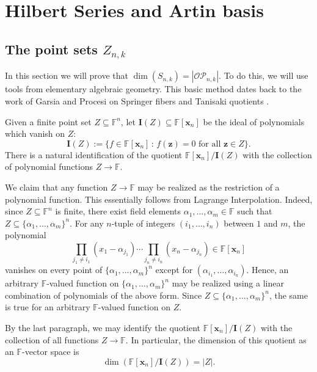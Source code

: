 \documentclass[ALCO,ThmDefs,published]{cedram}
\newcommand{\xx}{{\mathbf {x}}}
\newcommand{\FF}{{\mathbb{F}}}
\theoremstyle{plain}
\newcommand{\OP}{{\mathcal{OP}}}
\newcommand{\FF}{{\mathbb{F}}}
\newcommand{\zz}{{\mathbf {z}}}
\newcommand{\xx}{{\mathbf {x}}}
\newcommand{\II}{{\mathbf {I}}}
\begin{document}
\section{Hilbert Series and Artin basis}
\label{Hilbert}


\subsection{The point sets $Z_{n,k}$}
In this section we will prove that $\dim(S_{n,k}) = |\OP_{n,k}|$.
To do this, we will use tools from elementary algebraic geometry.
This basic method dates back to the work of Garsia and Procesi on Springer
fibers and Tanisaki quotients \cite{GP}.

Given a finite point set $Z \subseteq \FF^n$, let $\II(Z) \subseteq \FF[\xx_n]$ be the ideal of 
polynomials which vanish on $Z$:
\begin{equation}
\II(Z) := \{ f \in \FF[\xx_n] \,:\, f(\zz) = 0 \text{ for all $\zz \in Z$} \}.
\end{equation} 
There is a natural identification of the quotient ${\FF[\xx_n]} / {\II(Z)}$ with the collection of
polynomial functions $Z \rightarrow \FF$.


We claim that any function $Z \rightarrow \FF$ may be realized as the restriction of a polynomial
function.  This essentially follows from Lagrange Interpolation.  Indeed, since $Z \subseteq \FF^n$ is finite, there exist
field elements $\alpha_1, \dots, \alpha_m \in \FF$ such that $Z \subseteq \{\alpha_1, \dots, \alpha_m\}^n$. 
For any $n$-tuple of integers $(i_1, \dots, i_n)$ between $1$ and $m$, the polynomial
\begin{equation*}
\prod_{j_1 \neq i_1} (x_1 - \alpha_{j_1}) \cdots \prod_{j_n \neq i_n} (x_n - \alpha_{j_n}) \in \FF[\xx_n]
\end{equation*} 
vanishes on every point of $\{\alpha_1, \dots, \alpha_m\}^n$ except for 
$(\alpha_{i_1}, \dots, \alpha_{i_n})$.  Hence, an arbitrary $\FF$-valued function on
$\{\alpha_1, \dots, \alpha_m\}^n$ may be realized using a linear combination of polynomials of the above form.
Since $Z \subseteq \{\alpha_1, \dots, \alpha_m\}^n$, the same is true for an arbitrary $\FF$-valued function on $Z$.

By the last paragraph, we may identify the quotient ${\FF[\xx_n]} / {\II(Z)}$ with the collection of all 
functions $Z \rightarrow \FF$.
In particular, the dimension of this quotient as an $\FF$-vector space is
\begin{equation}
\dim \left( {\FF[\xx_n]} / {\II(Z)} \right) = |Z|.
\end{equation}
\end{document}
